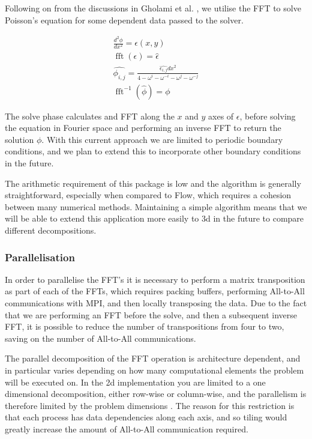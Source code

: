 \documentclass[runningheads,a4paper]{llncs}
\DeclareMathOperator{\fft}{fft}
\begin{document}
Following on from the discussions in Gholami et al. \cite{}, we utilise the FFT to solve Poisson's equation for some dependent data passed to the solver. 

\begin{align}
  \frac{d^2\phi}{dx^2} = \epsilon(x, y) \\
  \fft(\epsilon) = \hat{\epsilon} \\
  \hat{\phi_{i,j}} = \frac{\hat{\epsilon_{i,j}} dx^2 }{4 - \omega^i - \omega^{-i} - \omega^{j} - \omega^{-j}} \\
  \fft^{-1}(\hat{\phi}) = \phi
\end{align}

The solve phase calculates and FFT along the $x$ and $y$ axes of $\epsilon$, before solving the equation in Fourier space and performing an inverse FFT to return the solution $\phi$. With this current approach we are limited to periodic boundary conditions, and we plan to extend this to incorporate other boundary conditions in the future. 

The arithmetic requirement of this package is low and the algorithm is generally straightforward, especially when compared to Flow, which requires a cohesion between many numerical methods. Maintaining a simple algorithm means that we will be able to extend this application more easily to 3d in the future to compare different decompositions.

\subsubsection{Parallelisation}

In order to parallelise the FFT's it is necessary to perform a matrix transposition as part of each of the FFTs, which requires packing buffers, performing All-to-All communications with MPI, and then locally transposing the data. Due to the fact that we are performing an FFT before the solve, and then a subsequent inverse FFT, it is possible to reduce the number of transpositions from four to two, saving on the number of All-to-All communications.

The parallel decomposition of the FFT operation is architecture dependent, and in particular varies depending on how many computational elements the problem will be executed on. In the 2d implementation you are limited to a one dimensional decomposition, either row-wise or column-wise, and the parallelism is therefore limited by the problem dimensions \cite{}. The reason for this restriction is that each process has data dependencies along each axis, and so tiling would greatly increase the amount of All-to-All communication required. 
\end{document}
